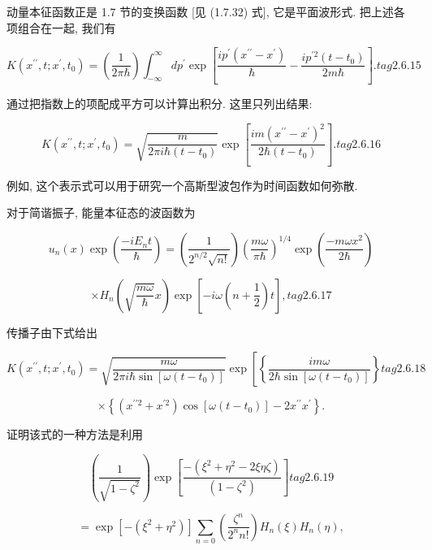 \documentclass[lang=cn,newtx,10pt,scheme=chinese,thmcnt=section]{elegantbook}
\begin{document}
动量本征函数正是 1.7 节的变换函数 [见 (1.7.32) 式], 它是平面波形式. 把上述各项组合在一起, 我们有

$$
K\left( {{x}^{\prime \prime }, t;{x}^{\prime },{t}_{0}}\right) = \left( \frac{1}{{2\pi }\hbar }\right) {\int }_{-\infty }^{\infty }d{p}^{\prime }\exp \left\lbrack {\frac{i{p}^{\prime }\left( {{x}^{\prime \prime } - {x}^{\prime }}\right) }{\hbar } - \frac{i{p}^{\prime 2}\left( {t - {t}_{0}}\right) }{{2m}\hbar }}\right\rbrack . tag{2.6.15}
$$

通过把指数上的项配成平方可以计算出积分. 这里只列出结果:

$$
K\left( {{x}^{\prime \prime }, t;{x}^{\prime },{t}_{0}}\right) = \sqrt{\frac{m}{{2\pi i}\hbar \left( {t - {t}_{0}}\right) }}\exp \left\lbrack \frac{{im}{\left( {x}^{\prime \prime } - {x}^{\prime }\right) }^{2}}{2\hbar \left( {t - {t}_{0}}\right) }\right\rbrack . tag{2.6.16}
$$

例如, 这个表示式可以用于研究一个高斯型波包作为时间函数如何弥散.

对于简谐振子, 能量本征态的波函数为

$$
{u}_{n}\left( x\right) \exp \left( \frac{-i{E}_{n}t}{\hbar }\right) = \left( \frac{1}{{2}^{n/2}\sqrt{n!}}\right) {\left( \frac{m\omega }{\pi \hbar }\right) }^{1/4}\exp \left( \frac{-{m\omega }{x}^{2}}{2\hbar }\right)
$$

$$
\times {H}_{n}\left( {\sqrt{\frac{m\omega }{\hbar }}x}\right) \exp \left\lbrack {-{i\omega }\left( {n + \frac{1}{2}}\right) t}\right\rbrack , tag{2.6.17}
$$

传播子由下式给出

$$
K\left( {{x}^{\prime \prime }, t;{x}^{\prime },{t}_{0}}\right) = \sqrt{\frac{m\omega }{{2\pi i}\hbar \sin \left\lbrack {\omega \left( {t - {t}_{0}}\right) }\right\rbrack }}\exp \left\lbrack \left\{ \frac{im\omega }{2\hbar \sin \left\lbrack {\omega \left( {t - {t}_{0}}\right) }\right\rbrack }\right\} \right. tag{2.6.18}
$$

$$
\times \left\{ {\left( {{x}^{\prime \prime 2} + {x}^{\prime 2}}\right) \cos \left\lbrack {\omega \left( {t - {t}_{0}}\right) }\right\rbrack - 2{x}^{\prime \prime }{x}^{\prime }}\right\} .
$$

证明该式的一种方法是利用

$$
\left( \frac{1}{\sqrt{1 - {\zeta }^{2}}}\right) \exp \left\lbrack \frac{-\left( {{\xi }^{2} + {\eta }^{2} - {2\xi \eta \zeta }}\right) }{\left( 1 - {\zeta }^{2}\right) }\right\rbrack tag{2. 6.19}
$$

$$
= \exp \left\lbrack {-\left( {{\xi }^{2} + {\eta }^{2}}\right) }\right\rbrack \mathop{\sum }\limits_{{n = 0}}\left( \frac{{\zeta }^{n}}{{2}^{n}n!}\right) {H}_{n}\left( \xi \right) {H}_{n}\left( \eta \right) ,
$$
\end{document}
